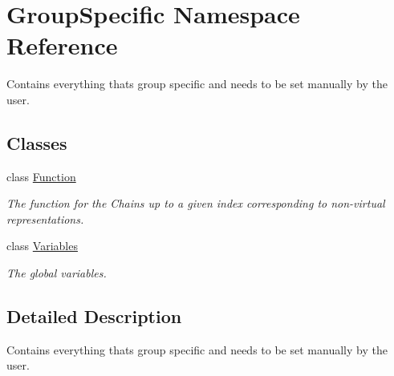 \hypertarget{namespaceGroupSpecific}{}\section{Group\+Specific Namespace Reference}
\label{namespaceGroupSpecific}


Contains everything that\textquotesingle{}s group specific and needs to be set manually by the user.  


\subsection*{Classes}
\begin{DoxyCompactItemize}
\item 
class \hyperlink{classGroupSpecific_1_1Function}{Function}
\begin{DoxyCompactList}\small\item\em The function for the Chains up to a given index corresponding to non-\/virtual representations. \end{DoxyCompactList}\item 
class \hyperlink{classGroupSpecific_1_1Variables}{Variables}
\begin{DoxyCompactList}\small\item\em The global variables. \end{DoxyCompactList}\end{DoxyCompactItemize}


\subsection{Detailed Description}
Contains everything that\textquotesingle{}s group specific and needs to be set manually by the user. 